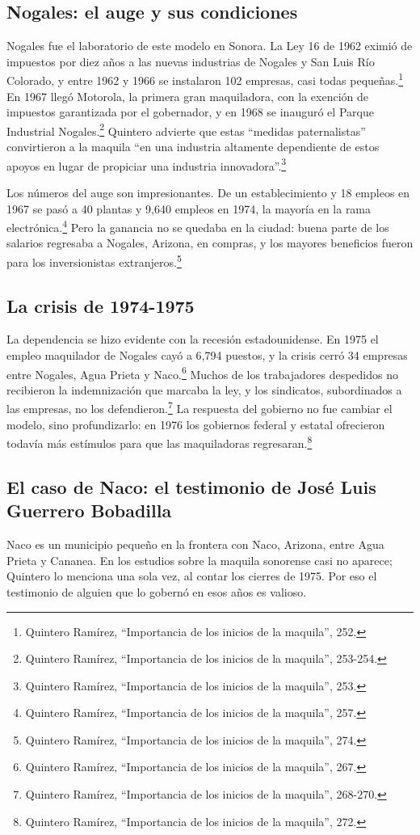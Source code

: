 \documentclass[12pt]{article}
\newcommand{\quintero}{Quintero Ramírez, \enquote{Importancia de los inicios de la maquila}}
\begin{document}
\subsection{Nogales: el auge y sus condiciones}

Nogales fue el laboratorio de este modelo en Sonora. La Ley 16 de 1962 eximió de impuestos por diez años a las nuevas industrias de Nogales y San Luis Río Colorado, y entre 1962 y 1966 se instalaron 102 empresas, casi todas pequeñas.\footnote{\quintero, 252.} En 1967 llegó Motorola, la primera gran maquiladora, con la exención de impuestos garantizada por el gobernador, y en 1968 se inauguró el Parque Industrial Nogales.\footnote{\quintero, 253-254.} Quintero advierte que estas \enquote{medidas paternalistas} convirtieron a la maquila \enquote{en una industria altamente dependiente de estos apoyos en lugar de propiciar una industria innovadora}.\footnote{\quintero, 253.}

Los números del auge son impresionantes. De un establecimiento y 18 empleos en 1967 se pasó a 40 plantas y 9,640 empleos en 1974, la mayoría en la rama electrónica.\footnote{\quintero, 257.} Pero la ganancia no se quedaba en la ciudad: buena parte de los salarios regresaba a Nogales, Arizona, en compras, y los mayores beneficios fueron para los inversionistas extranjeros.\footnote{\quintero, 274.}

\subsection{La crisis de 1974-1975}

La dependencia se hizo evidente con la recesión estadounidense. En 1975 el empleo maquilador de Nogales cayó a 6,794 puestos, y la crisis cerró 34 empresas entre Nogales, Agua Prieta y Naco.\footnote{\quintero, 267.} Muchos de los trabajadores despedidos no recibieron la indemnización que marcaba la ley, y los sindicatos, subordinados a las empresas, no los defendieron.\footnote{\quintero, 268-270.} La respuesta del gobierno no fue cambiar el modelo, sino profundizarlo: en 1976 los gobiernos federal y estatal ofrecieron todavía más estímulos para que las maquiladoras regresaran.\footnote{\quintero, 272.}

\subsection{El caso de Naco: el testimonio de José Luis Guerrero Bobadilla}

Naco es un municipio pequeño en la frontera con Naco, Arizona, entre Agua Prieta y Cananea.  En los estudios sobre la maquila sonorense casi no aparece; Quintero lo menciona una sola vez, al contar los cierres de 1975. Por eso el testimonio de alguien que lo gobernó en esos años es valioso.
\end{document}
